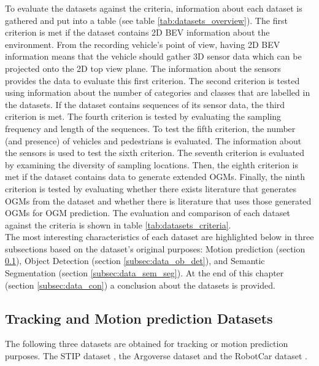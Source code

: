 To evaluate the datasets against the criteria, information about each dataset is gathered and put into a table (see table \ref{tab:datasets_overview}). The first criterion is met if the dataset contains 2D \gls{BEV} information about the environment. From the recording vehicle's point of view, having 2D \gls{BEV} information means that the vehicle should gather 3D sensor data which can be projected onto the 2D top view plane. The information about the sensors provides the data to evaluate this first criterion. The second criterion is tested using information about the number of categories and classes that are labelled in the datasets. If the dataset contains sequences of its sensor data, the third criterion is met. The fourth criterion is tested by evaluating the sampling frequency and length of the sequences. To test the fifth criterion, the number (and presence) of vehicles and pedestrians is evaluated. The information about the sensors is used to test the sixth criterion. The seventh criterion is evaluated by examining the diversity of sampling locations. Then, the eighth criterion is met if the dataset contains data to generate extended \glspl{OGM}. Finally, the ninth criterion is tested by evaluating whether there exists literature that generates \glspl{OGM} from the dataset and whether there is literature that uses those generated \glspl{OGM} for \gls{OGM} prediction. The evaluation and comparison of each dataset against the criteria is shown in table \ref{tab:datasets_criteria}. \\

The most interesting characteristics of each dataset are highlighted below in three subsections based on the dataset's original purposes: Motion prediction (section \ref{subsec:data_track_mot}), Object Detection (section \ref{subsec:data_ob_det}), and Semantic Segmentation (section \ref{subsec:data_sem_seg}). At the end of this chapter (section \ref{subsec:data_con}) a conclusion about the datasets is provided.


\subsection{Tracking and Motion prediction Datasets} \label{subsec:data_track_mot}
The following three datasets are obtained for tracking or motion prediction purposes. The \gls{STIP} dataset \cite{liu2020spatiotemporal}, the Argoverse dataset \cite{chang2019argoverse} and the RobotCar dataset \cite{robotcardatasetijrr}. \\

